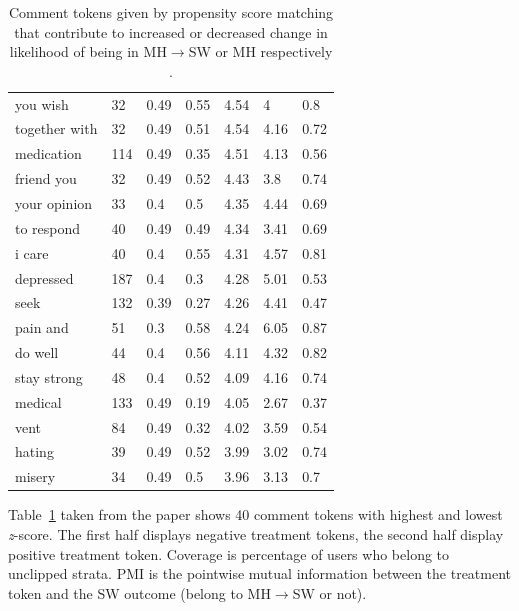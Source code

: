 \begin{table}
\begin{tabularx}{\textwidth}{>{\hsize=0.15\textwidth}X|XXXXXX}
you wish  & 32  & 0.49 &  0.55 &  4.54 &  4 &  0.8\\
together with  & 32  & 0.49 &  0.51  & 4.54  & 4.16  & 0.72\\
medication &  114 &  0.49 &  0.35 &  4.51  & 4.13 &  0.56\\
friend you &  32 &  0.49 &  0.52  & 4.43  & 3.8 &  0.74\\
your opinion &  33 &  0.4  & 0.5  & 4.35 &  4.44  & 0.69\\
to respond &  40 &  0.49  & 0.49 &  4.34  & 3.41 &  0.69\\
i care &  40  & 0.4 &  0.55  & 4.31  & 4.57 &  0.81\\
depressed &  187  & 0.4  & 0.3 &  4.28  & 5.01 &  0.53\\
seek  & 132  & 0.39  & 0.27  & 4.26  & 4.41  & 0.47\\
pain and &  51  & 0.3 &  0.58 &  4.24  & 6.05  & 0.87\\
do well  & 44 &  0.4  & 0.56  & 4.11  & 4.32 &  0.82\\
stay strong &  48 &  0.4  & 0.52  & 4.09  & 4.16 &  0.74\\
medical  & 133 &  0.49 &  0.19  & 4.05  & 2.67  & 0.37\\
vent &  84 &  0.49 &  0.32 & 4.02 &  3.59 &  0.54\\
hating &  39  & 0.49  & 0.52  & 3.99 &  3.02 &  0.74\\
misery  & 34  & 0.49 &  0.5  & 3.96 & 3.13 &  0.7\\
\bottomrule
\end{tabularx}
\caption{Comment tokens given by propensity score matching that contribute to increased or decreased change in likelihood of being in MH$\rightarrow$SW or MH respectively \cite{DeChoudhury2017}.}
\label{tab:treatment_token}
\end{table}
Table~\ref{tab:treatment_token} taken from the paper \cite{DeChoudhury2017} shows 40 comment tokens with highest and lowest \textit{z}-score. The first half displays negative treatment tokens, the second half display positive treatment token. Coverage is percentage of users who belong to unclipped strata. PMI is the pointwise mutual information between the treatment token and the SW outcome (belong to MH$\rightarrow$SW or not).

